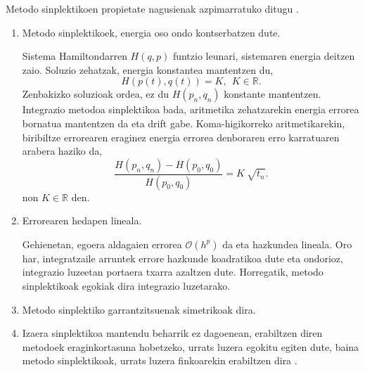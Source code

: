 Metodo sinplektikoen propietate nagusienak azpimarratuko ditugu \cite{Hairer2006,JMSanz-Serna1994}.
\begin{enumerate}

\item Metodo sinplektikoek, energia oso ondo kontserbatzen dute.

Sistema Hamiltondarren $H(q,p)$ funtzio leunari, sistemaren energia deitzen zaio. Soluzio zehatzak, energia konstantea mantentzen du,
\begin{equation*}
H(p(t),q(t))=K, \ \ K \in \mathbb{R}.
\end{equation*}
Zenbakizko soluzioak ordea, ez du $H(p_n,q_n)$  konstante mantentzen. Integrazio metodoa sinplektikoa bada, aritmetika zehatzarekin energia errorea bornatua mantentzen da eta drift gabe. Koma-higikorreko aritmetikarekin, biribiltze errorearen eraginez energia errorea denboraren erro karratuaren arabera haziko da,
\begin{equation*}
\frac{H(p_n,q_n)-H(p_0,q_0)}{H(p_0,q_0)}=K \ \sqrt{t_n}.
\end{equation*}
non $K\in \mathbb{R}$ den.

\item Errorearen hedapen lineala.

Gehienetan, egoera aldagaien errorea $\mathcal{O}(h^p)$ da eta hazkundea lineala. Oro har, integratzaile arruntek errore hazkunde koadratikoa dute eta ondorioz, integrazio luzeetan portaera txarra azaltzen dute. Horregatik, metodo sinplektikoak egokiak dira integrazio luzetarako.

\item Metodo sinplektiko garrantzitsuenak simetrikoak dira.

\item

Izaera sinplektikoa mantendu beharrik ez dagoenean, erabiltzen diren metodoek eraginkortasuna hobetzeko, urrats luzera egokitu egiten dute, baina metodo sinplektikoak, urrats luzera finkoarekin erabiltzen dira \cite{JMSanz-Serna1994}.

\end{enumerate} 

